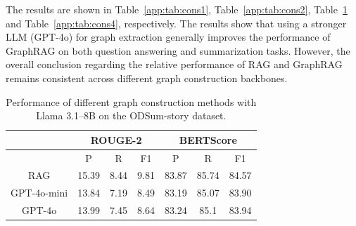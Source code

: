 The results are shown in Table~\ref{app:tab:cons1}, Table~\ref{app:tab:cons2}, Table~\ref{app:tab:cons3} and Table~\ref{app:tab:cons4}, respectively. The results show that using a stronger LLM (GPT-4o) for graph extraction generally improves the performance of GraphRAG on both question answering and summarization tasks. However, the overall conclusion regarding the relative performance of RAG and GraphRAG remains consistent across different graph construction backbones.

\begin{table}[!htb]
\centering
\caption{Performance of different graph construction methods with Llama 3.1–8B on the MultiHop-RAG dataset.}
\label{app:tab:cons1}
\end{table}

\begin{table}[!htb]
\centering
\caption{Performance of different graph construction methods with Llama 3.1–70B on the MultiHop-RAG dataset.}
\label{app:tab:cons2}
\end{table}

\begin{table}[!htb]
\centering
\caption{Performance of different graph construction methods with Llama 3.1–8B on the ODSum-story dataset.}
\label{app:tab:cons3}
\begin{tabular}{c|ccc|ccc}
\hline
          & \multicolumn{3}{c|}{ROUGE-2} & \multicolumn{3}{c}{BERTScore} \\ \hline
            & P        & R       & F1      & P        & R        & F1      \\ \hline
RAG         & 15.39    & 8.44    & 9.81    & 83.87    & 85.74    & 84.57   \\
GPT-4o-mini & 13.84    & 7.19    & 8.49    & 83.19    & 85.07    & 83.90    \\
GPT-4o      & 13.99    & 7.45    & 8.64    & 83.24    & 85.1     & 83.94   \\ \hline
\end{tabular}
\end{table}

